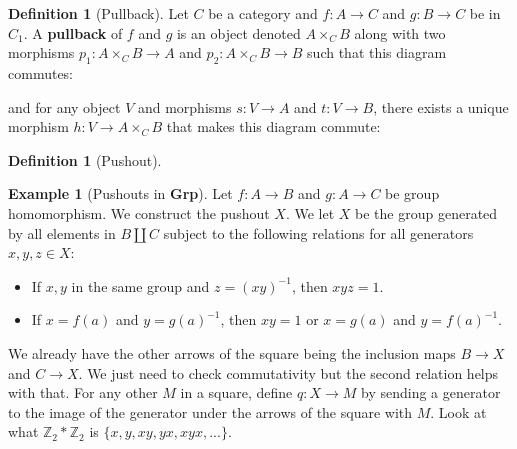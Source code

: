 \documentclass{scrartcl}
\theoremstyle{definition}
\newtheorem{defn}[thm]{Definition}
\newtheorem{exmp}[thm]{Example}
\theoremstyle{remark}
\newcommand{\Z}{\mathbb{Z}}
\begin{document}
\begin{defn}[Pullback]
    Let $C$ be a category and $f:A\rightarrow C$ and $g:B\rightarrow C$ be in $C_1$. A \textbf{pullback} of $f$ and $g$ is an object denoted $A \times_C B$ along with two morphisms $p_1: A \times_C B \rightarrow A$ and $p_2: A \times_C B \rightarrow B$ such that this diagram commutes: 
    \begin{figure}[h]
        \centering
    \end{figure}
    and for any object $V$ and morphisms $s:V\rightarrow A$ and $t:V\rightarrow B$, there exists a unique morphism $h:V\rightarrow A\times_C B$ that makes this diagram commute:
    \begin{figure}[h]
        \centering
    \end{figure}
\end{defn}

\begin{defn}[Pushout]
\end{defn}
\begin{exmp}[Pushouts in \textbf{Grp}]
    Let $f:A\rightarrow B$ and $g:A\rightarrow C$ be group homomorphism. We construct the pushout $X$. We let $X$ be the group generated by all elements in $B \amalg C$ subject to the following relations for all generators $x,y,z \in X$:
    \begin{itemize}
        \item If $x,y$ in the same group and $z=(xy)^{-1}$, then $xyz = 1$.
        \item If $x = f(a)$ and $y = g(a)^{-1}$, then $xy = 1$ or $x = g(a)$ and $y = f(a)^{-1}$.
    \end{itemize}
    We already have the other arrows of the square being the inclusion maps $B\rightarrow X$ and $C\rightarrow X$. We just need to check commutativity but the second relation helps with that. %
    For any other $M$ in a square, define $q:X \rightarrow M$ by sending a generator to the image of the generator under the arrows of the square with $M$. Look at what $\Z_2 \ast \Z_2$ is $\{x, y, xy, yx, xyx, ...\}$.
\end{exmp}
\end{document}
